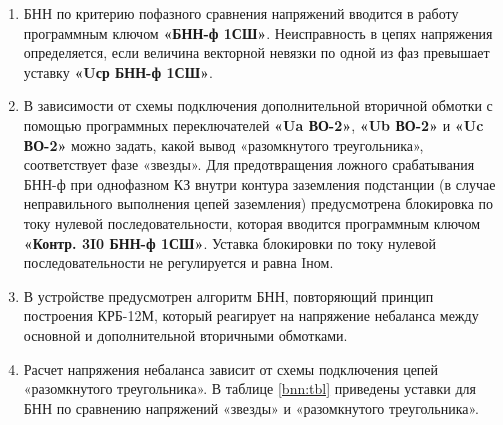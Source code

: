 \begin{enumerate}
\begin{equation}\label{eq:BNN_a}
U_{\textsl{БНН ф.A}} = \left| \dot U_{A\textsl{(ВО-1)}} - \frac{\dot U_{a\textsl{(ВО-2)}}}{\sqrt{3}} \right|
\end{equation}

\begin{equation}\label{eq:BNN_b}
U_{\textsl{БНН ф.В}} = \left| \dot U_{B\textsl{(ВО-1)}} - \frac{\dot U_{b\textsl{(ВО-2)}}}{\sqrt{3}} \right|
\end{equation}

\begin{equation}\label{eq:BNN_c}
U_{\textsl{БНН ф.С}} = \left| \dot U_{C\textsl{(ВО-1)}} - \frac{\dot U_{c\textsl{(ВО-2)}}}{\sqrt{3}} \right|
\end{equation}

\item
БНН по критерию пофазного сравнения напряжений вводится в работу программным ключом \textbf{«БНН-ф
1СШ»}. Неисправность в цепях напряжения определяется, если величина векторной невязки по одной из фаз 
превышает уставку \textbf{«Uср БНН-ф 1СШ»}. 

\item
В зависимости от схемы подключения дополнительной вторичной обмотки с помощью программных 
переключателей \textbf{«Ua ВО-2»}, \textbf{«Ub ВО-2»} и \textbf{«Uc ВО-2»} можно задать, какой вывод «разомкнутого треугольника», 
соответствует фазе «звезды». Для предотвращения ложного срабатывания БНН-ф при однофазном КЗ внутри 
контура заземления подстанции (в случае неправильного выполнения цепей заземления) предусмотрена 
блокировка по току нулевой последовательности, которая вводится программным ключом 
\textbf{«Контр. 3I0 БНН-ф 1СШ»}. Уставка блокировки по току нулевой последовательности не регулируется и равна Iном.

\item 
В устройстве предусмотрен алгоритм БНН, повторяющий принцип построения КРБ-12М, который
реагирует на напряжение небаланса между основной и дополнительной вторичными обмотками. 

\item 
Расчет напряжения небаланса зависит от схемы подключения цепей «разомкнутого треугольника». В таблице
\ref{bnn:tbl} приведены уставки для БНН по сравнению напряжений «звезды» и «разомкнутого треугольника».


\end{enumerate}
